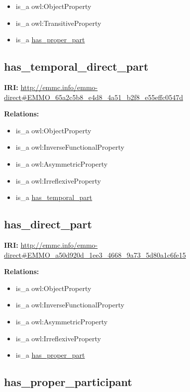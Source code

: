 \documentclass[a4paper,]{report}
\providecommand{\tightlist}{%
  \setlength{\itemsep}{0pt}\setlength{\parskip}{0pt}}
\begin{document}
\begin{itemize}
\tightlist
\item
  is\_a owl:ObjectProperty
\item
  is\_a owl:TransitiveProperty
\item
  is\_a \protect\hyperlink{has_proper_part}{has\_proper\_part}
\end{itemize}

\hypertarget{has_temporal_direct_part}{%
\subsection{has\_temporal\_direct\_part}\label{has_temporal_direct_part}}

\textbf{IRI:}
\url{http://emmc.info/emmo-direct\#EMMO_65a2c5b8_e4d8_4a51_b2f8_e55effc0547d}

\textbf{Relations:}

\begin{itemize}
\tightlist
\item
  is\_a owl:ObjectProperty
\item
  is\_a owl:InverseFunctionalProperty
\item
  is\_a owl:AsymmetricProperty
\item
  is\_a owl:IrreflexiveProperty
\item
  is\_a \protect\hyperlink{has_temporal_part}{has\_temporal\_part}
\end{itemize}

\hypertarget{has_direct_part}{%
\subsection{has\_direct\_part}\label{has_direct_part}}

\textbf{IRI:}
\url{http://emmc.info/emmo-direct\#EMMO_a50d920d_1ee3_4668_9a73_5d80a1c6fe15}

\textbf{Relations:}

\begin{itemize}
\tightlist
\item
  is\_a owl:ObjectProperty
\item
  is\_a owl:InverseFunctionalProperty
\item
  is\_a owl:AsymmetricProperty
\item
  is\_a owl:IrreflexiveProperty
\item
  is\_a \protect\hyperlink{has_proper_part}{has\_proper\_part}
\end{itemize}

\hypertarget{has_proper_participant}{%
\subsection{has\_proper\_participant}\label{has_proper_participant}}
\end{document}
